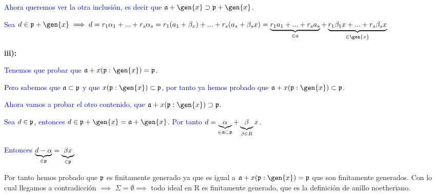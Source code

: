 \begin{problem}[1]
	\textcolor{blue}{Ahora queremos ver la otra inclusión, es decir que    $\aideal + \gen{x} \supset \pideal + \gen{x}$.}
	
	\textcolor{blue}{Sea $d \in \pideal +\gen{x} \implies d=r_1\alpha_1+...+r_s\alpha_s=r_1(a_1+\beta_x)+...+r_s(a_s+\beta_sx)=\underbrace{r_1a_1+...+r_sa_s}_{\in a}+\underbrace{r_1\beta_1x+...+r_s\beta_sx}_{\in \gen{x}}$}


	\textbf{iii):}
	
	\textcolor{blue}{Tenemos que probar que $\aideal+x(\pideal:\gen{x})=\pideal$.}
	
	\textcolor{blue}{Pero sabemos que $\mathfrak{a} \subset \mathfrak{p}$ y que $x(\pideal:\gen{x}) \subset \pideal$, por tanto ya hemos probado que $\aideal+x(\pideal:\gen{x}) \subset \pideal$.}

	\textcolor{blue}{Ahora vamos a probar el otro contenido, que $\aideal+x(\pideal:\gen{x}) \supset \pideal$.}
	
	\textcolor{blue}{Sea $d \in \mathfrak{p}$, entonces $d \in \pideal+\gen{x}=\aideal+ \gen{x}$. Por tanto $d=\underbrace{\alpha}_{\in \mathfrak{a} \subset \mathfrak{p}}+ \underbrace{\beta}_{\beta \in R}x$.}
	
	\textcolor{blue}{Entonces $\underbrace{d-\alpha}_{\in \mathfrak{p}}=\underbrace{\beta x}_{\in \mathfrak{p}}$}

	\spart

	Por tanto hemos probado que $\mathfrak{p}$ es finitamente generado ya que es igual a $\aideal+x(\pideal:\gen{x})=\pideal$ que son finitamente generados. Con lo cual llegamos a contradicción $\implies$ $\Sigma = \emptyset \implies$ todo ideal en R es finitamente generado, que es la definición de anillo noetheriano.
\end{problem}

